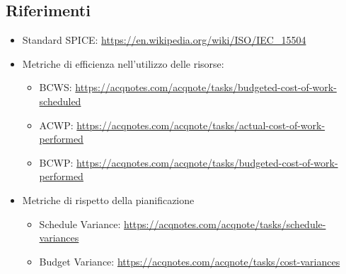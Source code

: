 \subsection{Riferimenti}
\begin{itemize}
    \item Standard SPICE: \newline \url{https://en.wikipedia.org/wiki/ISO/IEC_15504}
    \item Metriche di efficienza nell'utilizzo delle risorse:
    \begin{itemize}
        \item BCWS: \url{https://acqnotes.com/acqnote/tasks/budgeted-cost-of-work-scheduled}
        \item ACWP: \url{https://acqnotes.com/acqnote/tasks/actual-cost-of-work-performed}
        \item BCWP: \url{https://acqnotes.com/acqnote/tasks/budgeted-cost-of-work-performed}
    \end{itemize}
    \item Metriche di rispetto della pianificazione
    \begin{itemize}
        \item Schedule Variance: \url{https://acqnotes.com/acqnote/tasks/schedule-variances}
        \item Budget Variance: \url{https://acqnotes.com/acqnote/tasks/cost-variances}
    \end{itemize}
\end{itemize}